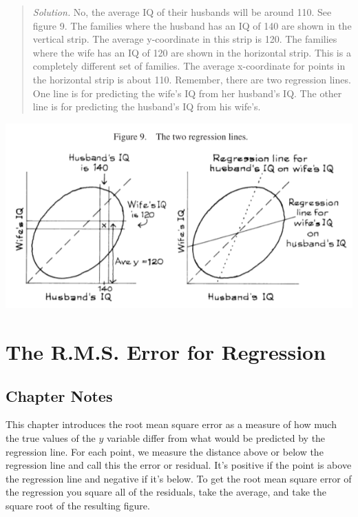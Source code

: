 \documentclass[
]{book}
\begin{document}
\begin{quote}
\emph{Solution.} No, the average IQ of their husbands will be around 110. See figure 9. The families where the husband has an IQ of 140 are shown in the vertical strip. The average y-coordinate in this strip is 120. The families where the wife has an IQ of 120 are shown in the horizontal strip. This is a completely different set of families. The average x-coordinate for points in the horizontal strip is about 110. Remember, there are two regression lines. One line is for predicting the wife's IQ from her husband's IQ. The other line is for predicting the husband's IQ from his wife's.
\end{quote}

\includegraphics{images/Ch10Img04.png}

\hypertarget{rms_error}{%
\chapter{The R.M.S. Error for Regression}\label{rms_error}}

\hypertarget{chapter-notes-10}{%
\section{Chapter Notes}\label{chapter-notes-10}}

This chapter introduces the root mean square error as a measure of how much the true values of the \(y\) variable differ from what would be predicted by the regression line. For each point, we measure the distance above or below the regression line and call this the error or residual. It's positive if the point is above the regression line and negative if it's below. To get the root mean square error of the regression you square all of the residuals, take the average, and take the square root of the resulting figure.
\end{document}
